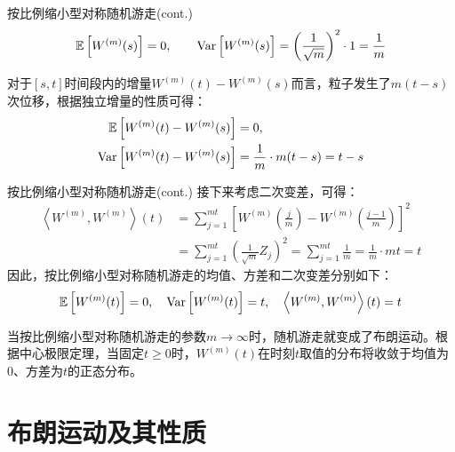 \documentclass[t]{beamer}
\newcommand{\E}{\mathbb{E}}
\newcommand{\Var}{{\rm Var}}
\begin{document}
\begin{frame}{按比例缩小型对称随机游走(cont.)}
  \begin{equation*}
    \E\left[W^{(m)}(s)\right]=0,\qquad \Var\left[W^{(m)}(s)\right]=\left(\frac{1}{\sqrt{m}}\right)^2\cdot 1=\frac{1}{m}
    \end{equation*}
    
    对于$[s,t]$时间段内的增量$W^{(m)}(t)-W^{(m)}(s)$而言，粒子发生了$m(t-s)$次位移，根据独立增量的性质可得：
    \begin{equation*}
    \begin{split}
    \E\left[W^{(m)}(t)-W^{(m)}(s)\right]&=0,\\ \Var\left[W^{(m)}(t)-W^{(m)}(s)\right]&=\frac{1}{m}\cdot m(t-s)=t-s
    \end{split}
    \end{equation*}
  \end{frame}


  \begin{frame}{按比例缩小型对称随机游走(cont.)}\small
    接下来考虑二次变差，可得：
    \begin{equation*}
    \begin{split}
    \left\langle W^{(m)},W^{(m)}\right\rangle(t) &=\sum^{mt}_{j=1}\left[W^{(m)}\left(\frac{j}{m}\right)-W^{(m)}\left(\frac{j-1}{m}\right) \right]^2 \\
    &=\sum^{mt}_{j=1}\left(\frac{1}{\sqrt{m}}Z_j\right)^2=\sum^{mt}_{j=1} \frac{1}{m}=\frac{1}{m}\cdot mt=t
    \end{split}
    \end{equation*}
    因此，按比例缩小型对称随机游走的均值、方差和二次变差分别如下：
\[\E\left[W^{(m)}(t)\right]=0,\quad  \Var\left[W^{(m)}(t)\right]=t,\quad \left\langle W^{(m)},W^{(m)}\right\rangle(t)=t\]  
\begin{block}{}
  当按比例缩小型对称随机游走的参数$m\to\infty$时，随机游走就变成了布朗运动。根据中心极限定理，当固定$t\ge 0$时，$W^{(m)}(t)$在时刻$t$取值的分布将收敛于均值为0、方差为$t$的正态分布。
\end{block}
\end{frame}


\section{布朗运动及其性质}
\end{document}
